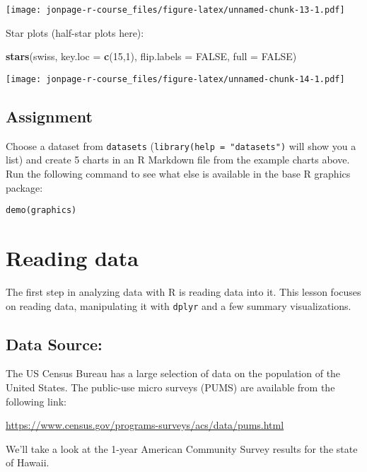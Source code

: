 \documentclass[]{book}
\newenvironment{Shaded}{\begin{snugshade}}{\end{snugshade}}
\newcommand{\KeywordTok}[1]{\textcolor[rgb]{0.13,0.29,0.53}{\textbf{{#1}}}}
\newcommand{\DataTypeTok}[1]{\textcolor[rgb]{0.13,0.29,0.53}{{#1}}}
\newcommand{\DecValTok}[1]{\textcolor[rgb]{0.00,0.00,0.81}{{#1}}}
\newcommand{\OtherTok}[1]{\textcolor[rgb]{0.56,0.35,0.01}{{#1}}}
\newcommand{\NormalTok}[1]{{#1}}
\theoremstyle{definition}
\theoremstyle{definition}
\theoremstyle{remark}
\begin{document}
\texttt{[image: jonpage-r-course\_files/figure-latex/unnamed-chunk-13-1.pdf]}

Star plots (half-star plots here):

\begin{Shaded}
\begin{Highlighting}[]
\KeywordTok{stars}\NormalTok{(swiss, }\DataTypeTok{key.loc =} \KeywordTok{c}\NormalTok{(}\DecValTok{15}\NormalTok{,}\DecValTok{1}\NormalTok{), }\DataTypeTok{flip.labels =} \OtherTok{FALSE}\NormalTok{, }\DataTypeTok{full =} \OtherTok{FALSE}\NormalTok{)}
\end{Highlighting}
\end{Shaded}

\texttt{[image: jonpage-r-course\_files/figure-latex/unnamed-chunk-14-1.pdf]}

\section{Assignment}\label{assignment}

Choose a dataset from \texttt{datasets}
(\texttt{library(help\ =\ "datasets")} will show you a list) and create
5 charts in an R Markdown file from the example charts above. Run the
following command to see what else is available in the base R graphics
package:

\begin{verbatim}
demo(graphics)
\end{verbatim}

\hypertarget{read-data}{\chapter{Reading data}\label{read-data}}

The first step in analyzing data with R is reading data into it. This
lesson focuses on reading data, manipulating it with \texttt{dplyr} and
a few summary visualizations.

\section{Data Source:}\label{data-source}

The US Census Bureau has a large selection of data on the population of
the United States. The public-use micro surveys (PUMS) are available
from the following link:

\url{https://www.census.gov/programs-surveys/acs/data/pums.html}

We'll take a look at the 1-year American Community Survey results for
the state of Hawaii.
\end{document}
